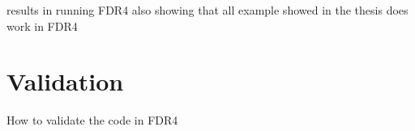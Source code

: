 results in running FDR4
also showing that all example showed in the thesis does work in FDR4


\section{Validation}
    How to validate the code in FDR4
